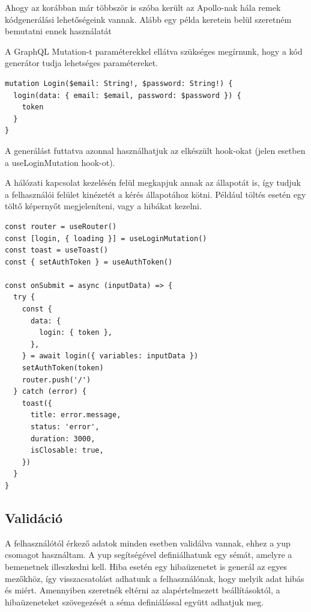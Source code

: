 Ahogy az korábban már többször is szóba került az Apollo-nak hála remek kódgenerálási lehetőségeink vannak.
Alább egy példa keretein belül szeretném bemutatni ennek használatát

A GraphQL Mutation-t paraméterekkel ellátva szükséges megírnunk, hogy a kód generátor tudja lehetséges paramétereket. 
\begin{lstlisting}[style=ES6, caption={GraphQL Shield}]
mutation Login($email: String!, $password: String!) {
  login(data: { email: $email, password: $password }) {
    token
  }
}
\end{lstlisting}

A generálást futtatva azonnal használhatjuk az elkészült hook-okat (jelen esetben a useLoginMutation hook-ot).

A hálózati kapcsolat kezelésén felül megkapjuk annak az állapotát is, így tudjuk a felhasználói felület kinézetét a kérés állapotához kötni.
Például töltés esetén egy töltő képernyőt megjeleníteni, vagy a hibákat kezelni.

\begin{lstlisting}[style=ES6, caption={Bejelentkezés kódrészlet}]
const router = useRouter()
const [login, { loading }] = useLoginMutation()
const toast = useToast()
const { setAuthToken } = useAuthToken()

const onSubmit = async (inputData) => {
  try {
    const {
      data: {
        login: { token },
      },
    } = await login({ variables: inputData })
    setAuthToken(token)
    router.push('/')
  } catch (error) {
    toast({
      title: error.message,
      status: 'error',
      duration: 3000,
      isClosable: true,
    })
  }
}
\end{lstlisting}

\subsection{Validáció}
A felhasználótól érkező adatok minden esetben validálva vannak, ehhez a yup csomagot használtam.
A yup segítségével definiálhatunk egy sémát, amelyre a bemenetnek illeszkedni kell. 
Hiba esetén egy hibaüzenetet is generál az egyes mezőkhöz, így visszacsatolást adhatunk a felhasználónak, hogy melyik adat hibás és miért.
Amennyiben szeretnék eltérni az alapértelmezett beállításoktól, a hibaüzeneteket szövegezését a séma definiálással együtt adhatjuk meg.

